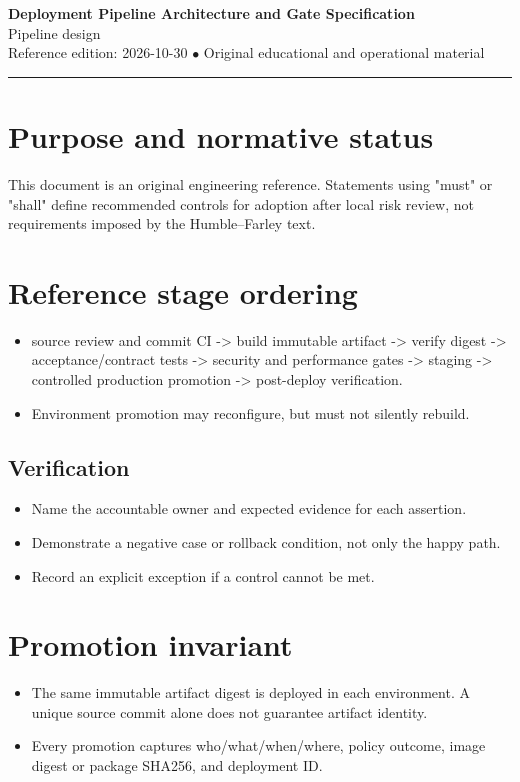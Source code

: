 \documentclass[10pt,letterpaper]{article}
\begin{document}
\begin{center}
{\LARGE\bfseries\color{cdblue}Deployment Pipeline Architecture and Gate Specification}\\[7pt]
{\large Pipeline design}\\[6pt]
{\small Reference edition: 2026-10-30 $\bullet$ Original educational and operational material}
\end{center}
\noindent\color{cdblue}\rule{\linewidth}{1.2pt}\color{black}
\vspace{0.4em}
\section{Purpose and normative status}
This document is an original engineering reference. Statements using "must" or "shall" define recommended controls for adoption after local risk review, not requirements imposed by the Humble--Farley text.


\section{Reference stage ordering}
\begin{itemize}
\item source review and commit CI -> build immutable artifact -> verify digest -> acceptance/contract tests -> security and performance gates -> staging -> controlled production promotion -> post-deploy verification.
\item Environment promotion may reconfigure, but must not silently rebuild.
\end{itemize}
\subsection{Verification}
\begin{itemize}
\item Name the accountable owner and expected evidence for each assertion.
\item Demonstrate a negative case or rollback condition, not only the happy path.
\item Record an explicit exception if a control cannot be met.
\end{itemize}


\section{Promotion invariant}
\begin{itemize}
\item The same immutable artifact digest is deployed in each environment. A unique source commit alone does not guarantee artifact identity.
\item Every promotion captures who/what/when/where, policy outcome, image digest or package SHA256, and deployment ID.
\end{itemize}
\end{document}
